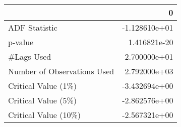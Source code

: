\begin{tabular}{lr}
\toprule
{} &             0 \\
\midrule
ADF Statistic               & -1.128610e+01 \\
p-value                     &  1.416821e-20 \\
\#Lags Used                  &  2.700000e+01 \\
Number of Observations Used &  2.792000e+03 \\
Critical Value (1\%)         & -3.432694e+00 \\
Critical Value (5\%)         & -2.862576e+00 \\
Critical Value (10\%)        & -2.567321e+00 \\
\bottomrule
\end{tabular}
